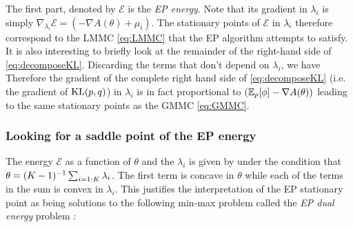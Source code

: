 %
%
The first part, denoted by $\mathcal E$ is the \emph{EP energy}. Note that its gradient in $\lambda_i$ is simply $\nabla_{\lambda_i}\mathcal E = (-\nabla A(\theta) + \mu_{i})$. 
The stationary points of $\mathcal E$ in $\lambda_i$ therefore correspond to the LMMC \eqref{eq:LMMC} that the EP algorithm attempts to satisfy.
It is also interesting to briefly look at the remainder of the right-hand side of \eqref{eq:decomposeKL}. Discarding the terms that don't depend on $\lambda_i$, we have
%
%
Therefore the gradient of the complete right hand side of \eqref{eq:decomposeKL} (i.e. the gradient of $\mathrm{KL}\!\left(p,q\right)$) in $\lambda_i$ is in fact proportional to $(\mathbb E_{p}[\phi]-\nabla A(\theta))$ leading to the same stationary points as the GMMC \eqref{eq:GMMC}.
%
\subsubsection*{Looking for a saddle point of the EP energy}

The energy $\mathcal E$ as a function of $\theta$ and the $\lambda_i$ is given by
under the condition that $\theta=(K-1)^{-1} \sum_{i=1:K}\lambda_i$. The first term is concave in $\theta$ while each of the terms in the sum is convex in $\lambda_i$. This justifies the interpretation of the EP stationary point as being solutions to the following min-max problem called the \emph{EP dual energy} problem \citep{minka01c}:



